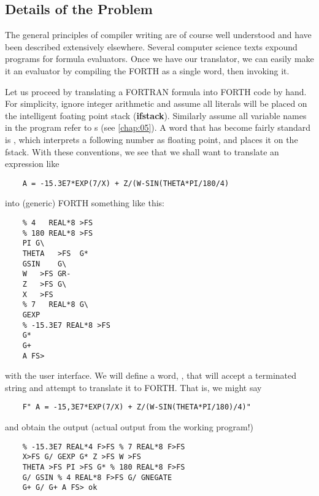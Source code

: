 \subsection{Details of the Problem}
The general principles of compiler writing are of course well understood and have been described extensively elsewhere. Several computer science texts expound programs for formula evaluators. Once we have our translator, we can easily make it an evaluator by compiling the FORTH as a single word, then invoking it.

Let us proceed by translating a FORTRAN formula into FORTH code by hand. For simplicity, ignore integer arithmetic and assume all literals will be placed on the intelligent foating point stack (\textbf{ifstack}). Similarly assume all variable names in the program refer to s (see \ref{chap:05}). A word that has become fairly standard is \bc{\%}, which interprets a following number as floating point, and places it on the fstack. With these conventions, we see that we shall want to translate an expression like

\begin{lstlisting}
    A = -15.3E7*EXP(7/X) + Z/(W-SIN(THETA*PI/180/4)
\end{lstlisting}

into (generic) FORTH something like this:

\begin{lstlisting}
    % 4   REAL*8 >FS
    % 180 REAL*8 >FS
    PI G\
    THETA   >FS  G*
    GSIN    G\
    W   >FS GR-
    Z   >FS G\
    X   >FS
    % 7   REAL*8 G\
    GEXP
    % -15.3E7 REAL*8 >FS
    G*
    G+
    A FS>
\end{lstlisting}

 with the user interface. We will define a word, , that will accept a terminated string and attempt to translate it to FORTH. That is, we might say

\begin{lstlisting}
    F" A = -15,3E7*EXP(7/X) + Z/(W-SIN(THETA*PI/180)/4)"
\end{lstlisting}

and obtain the output (actual output from the working program!)

\begin{lstlisting}
    % -15.3E7 REAL*4 F>FS % 7 REAL*8 F>FS
    X>FS G/ GEXP G* Z >FS W >FS
    THETA >FS PI >FS G* % 180 REAL*8 F>FS
    G/ GSIN % 4 REAL*8 F>FS G/ GNEGATE
    G+ G/ G+ A FS> ok
\end{lstlisting}

